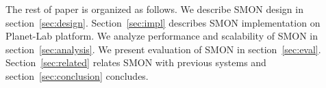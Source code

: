 The rest of paper is organized as follows. We describe SMON
design in section~\ref{sec:design}.
Section~\ref{sec:impl} describes
SMON implementation on Planet-Lab platform. We analyze
performance and scalability of SMON in
section~\ref{sec:analysis}. We present evaluation of SMON in
section~\ref{sec:eval}.  Section~\ref{sec:related} relates
SMON with previous systems and section~\ref{sec:conclusion}
concludes.


